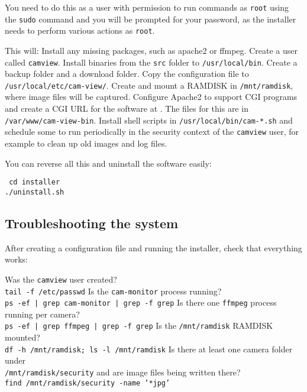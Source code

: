     You need to do this as a user with permission to run commands as
    \texttt{root} using the \texttt{sudo} command and you will be prompted
    for your password, as the installer needs to perform various actions
    as \texttt{root}.

    This will:
    \BI
    \I Install any missing packages, such as apache2 or ffmpeg.
    \I Create a user called \texttt{camview}.
    \I Install binaries from the \texttt{src} folder to \texttt{/usr/local/bin}.
    \I Create a backup folder and a download folder.
    \I Copy the configuration file to \texttt{/usr/local/etc/cam-view/}.
    \I Create and mount a RAMDISK in \texttt{/mnt/ramdisk}, where image
       files will be captured.
    \I Configure Apache2 to support CGI programs and create a CGI URL
       for the software at .  The files
       for this are in \texttt{/var/www/cam-view-bin}.
    \I Install shell scripts in \texttt{/usr/local/bin/cam-*.sh} and
       schedule some to run periodically in the security context of
       the \texttt{camview} user, for example to clean up old images and
       log files.
    \EI

    You can reverse all this and uninstall the software easily:

    \texttt{%
    cd installer\\
    ./uninstall.sh}

  \subsection{Troubleshooting the system}

    After creating a configuration file and running the installer,
    check that everything works:

    \BE
    \I Was the \texttt{camview} user created?\\
       \texttt{tail -f /etc/passwd}
    \I Is the \texttt{cam-monitor} process running?\\
       \texttt{ps -ef | grep cam-monitor | grep -f grep}
    \I Is there one \texttt{ffmpeg} process running per camera?\\
       \texttt{ps -ef | grep ffmpeg | grep -f grep}
    \I Is the \texttt{/mnt/ramdisk} RAMDISK mounted?\\
       \texttt{df -h /mnt/ramdisk; ls -l /mnt/ramdisk}
    \I Is there at least one camera folder under\\
       \texttt{/mnt/ramdisk/security} and are
       image files being written there?\\
       \texttt{find /mnt/ramdisk/security -name '*jpg'}
    \EE

